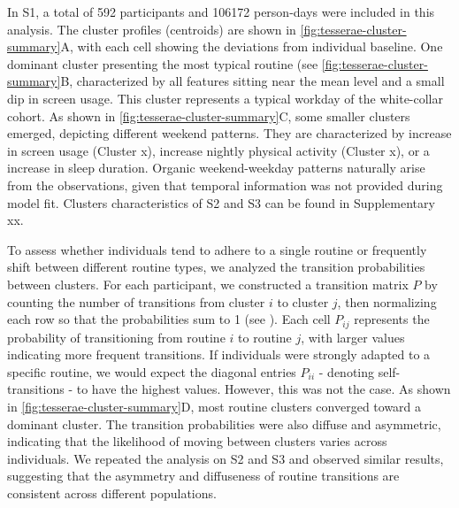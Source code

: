 \documentclass[pdflatex,sn-vancouver,Numbered]{bst/sn-jnl}%
\theoremstyle{thmstyleone}%
\theoremstyle{thmstyletwo}%
\theoremstyle{thmstylethree}%
\begin{document}
In S1, a total of 592 participants and 106172 person-days were included in this analysis. The cluster profiles (centroids) are shown in \autoref{fig:tesserae-cluster-summary}A, with each cell showing the deviations from individual baseline.  One dominant cluster presenting the most typical routine (see \autoref{fig:tesserae-cluster-summary}B, characterized by all features sitting near the mean level and a small dip in screen usage. This cluster represents a typical workday of the white-collar cohort. As shown in \autoref{fig:tesserae-cluster-summary}C, some smaller clusters emerged, depicting different weekend patterns. They are characterized by increase in screen usage (Cluster x), increase nightly physical activity (Cluster x), or a increase in sleep duration. Organic weekend-weekday patterns naturally arise from the observations, given that temporal information was not provided during model fit. Clusters characteristics of S2 and S3 can be found in Supplementary xx.

To assess whether individuals tend to adhere to a single routine or frequently shift between different routine types, we analyzed the transition probabilities between clusters. For each participant, we constructed a transition matrix \(P\) by counting the number of transitions from cluster \(i\) to cluster \(j\), then normalizing each row so that the probabilities sum to 1 (see ). Each cell \(P_{ij}\) represents the probability of transitioning from routine \(i\) to routine \(j\), with larger values indicating more frequent transitions. If individuals were strongly adapted to a specific routine, we would expect the diagonal entries \(P_{ii}\) - denoting self-transitions - to have the highest values. However, this was not the case. As shown in \autoref{fig:tesserae-cluster-summary}D, most routine clusters converged toward a dominant cluster. The transition probabilities were also diffuse and asymmetric, indicating that the likelihood of moving between clusters varies across individuals. We repeated the analysis on S2 and S3 and observed similar results, suggesting that the asymmetry and diffuseness of routine transitions are consistent across different populations.
\end{document}
